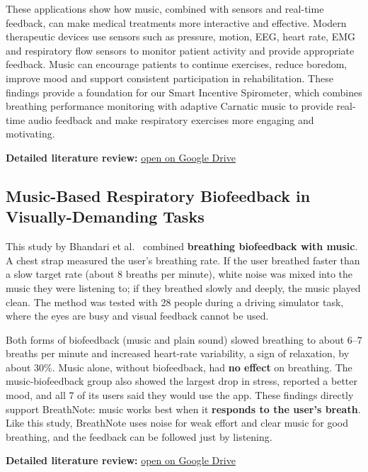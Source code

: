 \documentclass[12pt,a4paper]{article}
\begin{document}
These applications show how music, combined with sensors and real-time feedback, can make medical treatments more interactive and effective. Modern therapeutic devices use sensors such as pressure, motion, EEG, heart rate, EMG and respiratory flow sensors to monitor patient activity and provide appropriate feedback. Music can encourage patients to continue exercises, reduce boredom, improve mood and support consistent participation in rehabilitation. These findings provide a foundation for our Smart Incentive Spirometer, which combines breathing performance monitoring with adaptive Carnatic music to provide real-time audio feedback and make respiratory exercises more engaging and motivating.

\textbf{Detailed literature review:} \href{https://drive.google.com/file/d/1YBXndtCKjFerO3c2p_Vs28XbYyug1_ph/view?usp=sharing}{open on Google Drive}

\subsection{Music-Based Respiratory Biofeedback in Visually-Demanding Tasks}
This study by Bhandari et al.\ \cite{bhandari} combined \textbf{breathing biofeedback with music}. A chest strap measured the user's breathing rate. If the user breathed faster than a slow target rate (about 8 breaths per minute), white noise was mixed into the music they were listening to; if they breathed slowly and deeply, the music played clean. The method was tested with 28 people during a driving simulator task, where the eyes are busy and visual feedback cannot be used.

Both forms of biofeedback (music and plain sound) slowed breathing to about 6--7 breaths per minute and increased heart-rate variability, a sign of relaxation, by about 30\%. Music alone, without biofeedback, had \textbf{no effect} on breathing. The music-biofeedback group also showed the largest drop in stress, reported a better mood, and all 7 of its users said they would use the app. These findings directly support BreathNote: music works best when it \textbf{responds to the user's breath}. Like this study, BreathNote uses noise for weak effort and clear music for good breathing, and the feedback can be followed just by listening.

\textbf{Detailed literature review:} \href{https://drive.google.com/file/d/1iFs1RzvyBO_vjB4TUaPNZYcCvI5kTvV9/view?usp=sharing}{open on Google Drive}

\end{document}
